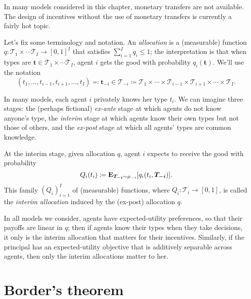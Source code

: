 In many models considered in this chapter, monetary transfers are not available.
The design of incentives without the use of monetary transfers is currently a fairly hot topic.


Let's fix some terminology and notation.
An \emph{allocation} is a (measurable) function $q : \mathcal{T}_1 \times \cdots \mathcal{T}_I \to [0,1]^I$ that satisfies $\sum_{i=1}^I q_i \leq 1$;
the interpretation is that when types are $\boldsymbol{t} \in \mathcal{T}_1 \times \cdots \mathcal{T}_I$, agent $i$ gets the good with probability $q_i(\boldsymbol{t})$.
We'll use the notation
%
\begin{equation*}
	(t_1,\dots,t_{i-1},t_{i+1},\dots,t_I)
	\eqqcolon \boldsymbol{t}_{-i}
	\in \mathcal{T}_{-i}
	\coloneqq \mathcal{T}_1 \times \cdots \times \mathcal{T}_{i-1}
	\times \mathcal{T}_{i+1} \times \cdots \times \mathcal{T}_I .
\end{equation*}

In many models, each agent $i$ privately knows her type $t_i$.
We can imagine three stages:
the (perhaps fictional) \emph{ex-ante} stage at which agents do not know anyone's type,
the \emph{interim} stage at which agents know their own types but not those of others,
and the \emph{ex-post} stage at which all agents' types are common knowledge.

At the interim stage, given allocation $q$, agent $i$ expects to receive the good with probability
%
\begin{equation*}
	Q_i(t_i)
	\coloneqq \E_{\boldsymbol{T_{-i}} \sim \mu_{-i}}\left[ q_i(t_i,\boldsymbol{T_{-i}}) \right] .
\end{equation*}
%
This family $(Q_i)_{i=1}^I$ of (measurable) functions, where $Q_i : \mathcal{T}_i \to [0,1]$,
is called the \emph{interim allocation} induced by the (ex-post) allocation $q$.

In all models we consider, agents have expected-utility preferences, so that their payoffs are linear in $q$; then if agents know their types when they take decisions, it only is the interim allocation that matters for their incentives.
Similarly, if the principal has an expected-utility objective that is additively separable across agents, then only the interim allocations matter to her.



\section{Border's theorem}
\label{sec:ch2:border}

